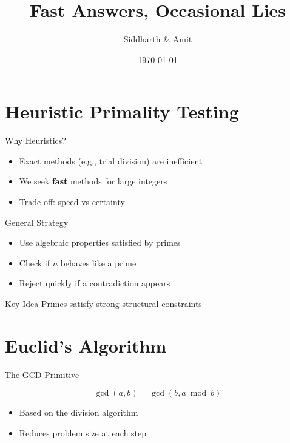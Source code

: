 \documentclass{beamer}
\title{Fast Answers, Occasional Lies}
\author{Siddharth \& Amit}
\date{\today}
\newcommand{\bld}[1]{\textbf{#1}}
\begin{document}
\maketitle

\section{Heuristic Primality Testing}

\begin{frame}{Why Heuristics?}

\begin{itemize}
    \item Exact methods (e.g., trial division) are inefficient
    \item We seek \bld{fast} methods for large integers
    \item Trade-off: speed vs certainty
\end{itemize}

\end{frame}


\begin{frame}{General Strategy}

\begin{itemize}
    \item Use algebraic properties satisfied by primes
    \item Check if $n$ behaves like a prime
    \item Reject quickly if a contradiction appears
\end{itemize}


\begin{block}{Key Idea}
Primes satisfy strong structural constraints
\end{block}

\end{frame}

\section{Euclid's Algorithm}

\begin{frame}{The GCD Primitive}

\[
\gcd(a,b) = \gcd(b, a \bmod b)
\]


\begin{itemize}
    \item Based on the division algorithm
    \item Reduces problem size at each step
\end{itemize}

\end{frame}
\end{document}
